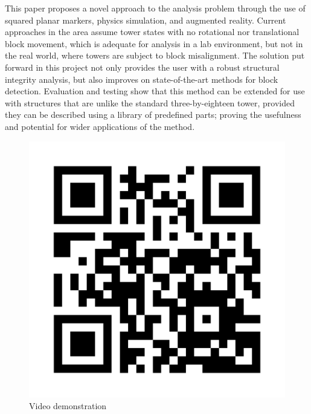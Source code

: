 \abstract
This paper proposes a novel approach to the \jenga{} analysis problem through the use of squared planar markers, physics simulation, and augmented reality. Current approaches in the area assume tower states with no rotational nor translational block movement, which is adequate for analysis in a lab environment, but not in the real world, where towers are subject to block misalignment. The solution put forward in this project not only provides the user with a robust structural integrity analysis, but also improves on state-of-the-art methods for block detection. Evaluation and testing show that this method can be extended for use with structures that are unlike the standard three-by-eighteen \jenga{} tower, provided they can be described using a library of predefined parts; proving the usefulness and potential for wider applications of the method.

\begin{figure}[p]
    \centering
    \includegraphics[width=.5\linewidth]{images/qr}
    \caption{Video demonstration}
    \label{fig:demoqr}
\end{figure}
